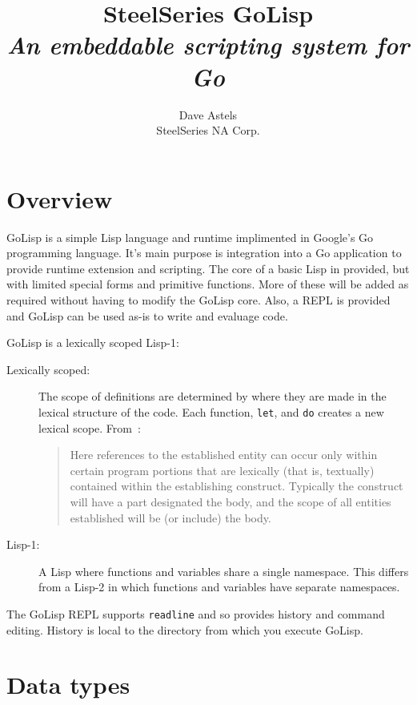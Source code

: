 \documentclass[12pt]{article}
\title{SteelSeries GoLisp \\ {\small\it An embeddable scripting system for Go}}
\author{Dave Astels \\ SteelSeries NA Corp.}
\begin{document}
\maketitle

\section{Overview}

GoLisp is a simple Lisp language and runtime implimented in Google's
Go programming language. It's main purpose is integration into a Go
application to provide runtime extension and scripting. The core of a
basic Lisp in provided, but with limited special forms and primitive
functions. More of these will be added as required without having to
modify the GoLisp core. Also, a REPL is provided and GoLisp can be
used as-is to write and evaluage code.

GoLisp is a lexically scoped Lisp-1:

\begin{description}
\item[Lexically scoped:] The scope of definitions are determined by
  where they are made in the lexical structure of the code. Each
  function, \verb|let|, and \verb|do| creates a new lexical scope. From~\cite{Gabriel:1988:ETI}:

  \begin{quotation}
    Here references to the established entity can occur only within
    certain program portions that are lexically (that is, textually)
    contained within the establishing construct. Typically the
    construct will have a part designated the body, and the scope of
    all entities established will be (or include) the body.
  \end{quotation}

\item[Lisp-1:] A Lisp where functions and variables share a single
  namespace. This differs from a Lisp-2 in which functions and
  variables have separate namespaces.
\end{description}

The GoLisp REPL supports \verb|readline| and so provides history and
command editing. History is local to the directory from which you
execute GoLisp.

\section{Data types}
\end{document}
